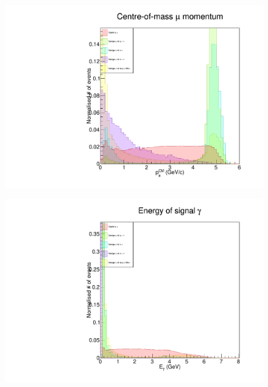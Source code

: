 \documentclass[12pt]{thesis}  %
\begin{document}
\begin{figure}[h]
\centering
\begin{minipage}{.5\textwidth}
  \centering
  \includegraphics[width=\linewidth]{images/taupair-muCM_P.pdf}
  \label{fig:test1}
\end{minipage}%
\begin{minipage}{.5\textwidth}
  \centering
  \includegraphics[width=\linewidth]{images/taupair-gamma_E.pdf}
  \label{fig:test2}
\end{minipage}
\end{figure}
\end{document}
